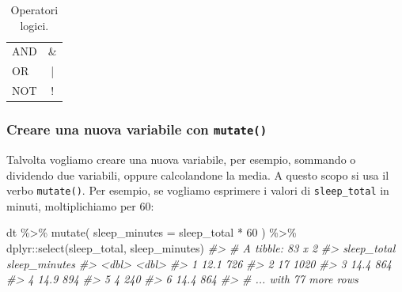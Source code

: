 \documentclass[
  10pt,
  italian,
  a4paper,
  extrafontsizes,onecolumn,openright
  ]{memoir}
\newenvironment{Shaded}{\begin{snugshade}}{\end{snugshade}}
\newcommand{\AttributeTok}[1]{\textcolor[rgb]{0.77,0.63,0.00}{#1}}
\newcommand{\CommentTok}[1]{\textcolor[rgb]{0.56,0.35,0.01}{\textit{#1}}}
\newcommand{\DecValTok}[1]{\textcolor[rgb]{0.00,0.00,0.81}{#1}}
\newcommand{\FunctionTok}[1]{\textcolor[rgb]{0.00,0.00,0.00}{#1}}
\newcommand{\NormalTok}[1]{#1}
\newcommand{\SpecialCharTok}[1]{\textcolor[rgb]{0.00,0.00,0.00}{#1}}
\begin{document}
\begin{table}[h!]
  \begin{center}
    \caption{Operatori logici.}
    \label{tab:oplogici}
    \begin{tabular}{l c} 
      \toprule
      AND      &  \&    \\
      OR       &  | \\
      NOT      &  !   \\
      \bottomrule
    \end{tabular}
  \end{center}
\end{table}

\hypertarget{creare-una-nuova-variabile-con-mutate}{%
\subsubsection{\texorpdfstring{Creare una nuova variabile con \texttt{mutate()}}{Creare una nuova variabile con mutate()}}\label{creare-una-nuova-variabile-con-mutate}}

Talvolta vogliamo creare una nuova variabile, per esempio, sommando o dividendo due variabili, oppure calcolandone la media. A questo scopo si usa il verbo \texttt{mutate()}. Per esempio, se vogliamo esprimere i valori di \texttt{sleep\_total} in minuti, moltiplichiamo per 60:

\begin{Shaded}
\begin{Highlighting}[]
\NormalTok{dt }\SpecialCharTok{\%\textgreater{}\%} 
  \FunctionTok{mutate}\NormalTok{(}
    \AttributeTok{sleep\_minutes =}\NormalTok{ sleep\_total }\SpecialCharTok{*} \DecValTok{60}
\NormalTok{  ) }\SpecialCharTok{\%\textgreater{}\%}
\NormalTok{  dplyr}\SpecialCharTok{::}\FunctionTok{select}\NormalTok{(sleep\_total, sleep\_minutes)}
\CommentTok{\#\textgreater{} \# A tibble: 83 x 2}
\CommentTok{\#\textgreater{}   sleep\_total sleep\_minutes}
\CommentTok{\#\textgreater{}         \textless{}dbl\textgreater{}         \textless{}dbl\textgreater{}}
\CommentTok{\#\textgreater{} 1        12.1           726}
\CommentTok{\#\textgreater{} 2        17            1020}
\CommentTok{\#\textgreater{} 3        14.4           864}
\CommentTok{\#\textgreater{} 4        14.9           894}
\CommentTok{\#\textgreater{} 5         4             240}
\CommentTok{\#\textgreater{} 6        14.4           864}
\CommentTok{\#\textgreater{} \# ... with 77 more rows}
\end{Highlighting}
\end{Shaded}
\end{document}
